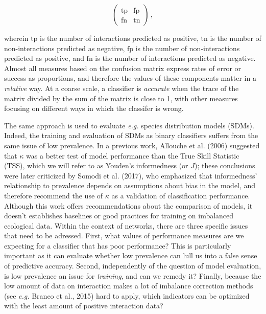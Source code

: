 \documentclass[10pt,oneside]{article}
\begin{document}
\[\begin{pmatrix}
    \text{tp} & \text{fp} \\
    \text{fn} & \text{tn}
\end{pmatrix} \,,\]

wherein \(\text{tp}\) is the number of interactions predicted as
positive, \(\text{tn}\) is the number of non-interactions predicted as
negative, \(\text{fp}\) is the number of non-interactions predicted as
positive, and \(\text{fn}\) is the number of interactions predicted as
negative. Almost all measures based on the confusion matrix express
rates of error or success as proportions, and therefore the values of
these components matter in a \emph{relative} way. At a coarse scale, a
classifier is \emph{accurate} when the trace of the matrix divided by
the sum of the matrix is close to 1, with other measures focusing on
different ways in which the classifer is wrong.

The same approach is used to evaluate \emph{e.g.} species distribution
models (SDMs). Indeed, the training and evaluation of SDMs as binary
classifiers suffers from the same issue of low prevalence. In a previous
work, Allouche et al. (2006) suggested that \(\kappa\) was a better test
of model performance than the True Skill Statistic (TSS), which we will
refer to as Youden's informedness (or \(J\)); these conclusions were
later criticized by Somodi et al. (2017), who emphasized that
informedness' relationship to prevalence depends on assumptions about
bias in the model, and therefore recommend the use of \(\kappa\) as a
validation of classification performance. Although this work offers
recommendations about the comparison of models, it doesn't establishes
baselines or good practices for training on imbalanced ecological data.
Within the context of networks, there are three specific issues that
need to be adressed. First, what values of performance measures are we
expecting for a classifier that has poor performance? This is
particularly important as it can evaluate whether low prevalence can
lull us into a false sense of predictive accuracy. Second, independently
of the question of model evaluation, is low prevalence an issue for
\emph{training}, and can we remedy it? Finally, because the low amount
of data on interaction makes a lot of imbalance correction methods (see
\emph{e.g.} Branco et al., 2015) hard to apply, which indicators can be
optimized with the least amount of positive interaction data?
\end{document}
